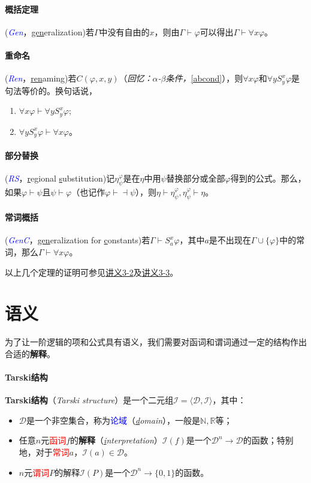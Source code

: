\documentclass[b5paper,oneside]{ctexbook}
\newcommand{\Blue}[1]{\textcolor[named]{blue}{#1}}
\newcommand{\Red}[1]{\textcolor[named]{red}{#1}}
\begin{document}
\paragraph{概括定理}(\Blue{\textit{Gen}}，\underline{gen}eralization)若$\Gamma$中没有自由的$x$，则由$\Gamma\vdash\varphi$可以得出$\Gamma\vdash\forall x\varphi$。
\paragraph{重命名}(\Blue{\textit{Ren}}，\underline{ren}aming)若$C(\varphi,x,y)$（\textit{回忆：$\alpha$-$\beta$条件，}\ref{abcond}），则$\forall x\varphi$和$\forall yS_y^x\varphi$是句法等价的。换句话说，
\begin{enumerate}
\item $\forall x\varphi\vdash\forall yS_y^x\varphi$;
\item $\forall yS_y^x\varphi\vdash\forall x\varphi$。
\end{enumerate}
\paragraph{部分替换}(\Blue{\textit{RS}}，\underline{r}egional \underline{s}ubstitution)记$\eta_\psi^\varphi$是在$\eta$中用$\psi$替换部分或全部$\varphi$得到的公式。那么，如果$\varphi\vdash\psi$且$\psi\vdash\varphi$（也记作$\varphi\vdash\dashv\psi$），则$\eta\vdash\eta_\psi^\varphi,\eta_\psi^\varphi\vdash\eta$。
\paragraph{常词概括}(\Blue{\textit{GenC}}，\underline{gen}eralization for \underline{c}onstants)若$\Gamma\vdash S_a^x\varphi$，其中$a$是不出现在$\Gamma\cup\{\varphi\}$中的常词，那么$\Gamma\vdash\forall x\varphi$。

以上几个定理的证明可参见\href{http://iscasmc.ios.ac.cn/DM2016/annotated3-2.pdf}{讲义3-2}及\href{http://iscasmc.ios.ac.cn/DM2016/annotated3-3.pdf}{讲义3-3}。
\section{语义}
为了让一阶逻辑的项和公式具有语义，我们需要对函词和谓词通过一定的结构作出合适的\textbf{解释}。
\paragraph{Tarski结构}\textbf{Tarski结构}（\textit{Tarski structure}）是一个二元组$\mathscr{I}=\langle\mathcal{D},\mathcal{I}\rangle$，其中：
\begin{itemize}
\item $\mathcal{D}$是一个非空集合，称为\Blue{论域}（\textit{\underline{d}omain}），一般是$\mathbb{N},\mathbb{R}$等；
\item 任意$n$元\Red{函词}$f$的\textbf{解释}（\textit{\underline{i}nterpretation}）$\mathcal{I}(f)$是一个$\mathcal{D}^n\to\mathcal{D}$的函数；特别地，对于\Red{常词}$a$，$\mathcal{I}(a)\in\mathcal{D}$。
\item $n$元\Red{谓词}$P$的解释$\mathcal{I}(P)$是一个$\mathcal{D}^n\to\{0,1\}$的函数。
\end{itemize}
\end{document}
